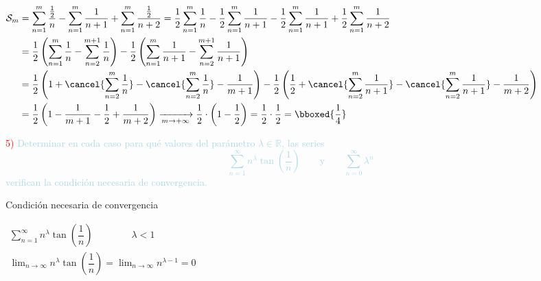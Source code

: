 \begin{enumerate}[label=\color{red}\alph*)]
		$\begin{aligned}
			\mathcal{S}_m&=\sum_{n=1}^{m}\dfrac{\frac{1}{2}}{n}-\sum_{n=1}^{m}\dfrac{1}{n+1}+\sum_{n=1}^{m}\dfrac{\frac{1}{2}}{n+2}=\dfrac{1}{2}\sum_{n=1}^{m}\dfrac{1}{n}-\dfrac{1}{2}\sum_{n=1}^{m}\dfrac{1}{n+1}-\dfrac{1}{2}\sum_{n=1}^{m}\dfrac{1}{n+1}+\dfrac{1}{2}\sum_{n=1}^{m}\dfrac{1}{n+2}\\
			&=\dfrac{1}{2}\left(\sum_{n=1}^{m}\dfrac{1}{n}-\sum_{n=2}^{m+1}\dfrac{1}{n}\right)-\dfrac{1}{2}\left(\sum_{n=1}^{m}\dfrac{1}{n+1}-\sum_{n=2}^{m+1}\dfrac{1}{n+1}\right)\\
			&=\dfrac{1}{2}\left(1+\cancel{\sum_{n=2}^{m}\dfrac{1}{n}}-\cancel{\sum_{n=2}^{m}\dfrac{1}{n}}-\dfrac{1}{m+1}\right)-\dfrac{1}{2}\left(\dfrac{1}{2}+\cancel{\sum_{n=2}^{m}\dfrac{1}{n+1}}-\cancel{\sum_{n=2}^{m}\dfrac{1}{n+1}}-\dfrac{1}{m+2}\right)\\
			&=\dfrac{1}{2}\left(1-\dfrac{1}{m+1}-\dfrac{1}{2}+\dfrac{1}{m+2}\right)\xrightarrow[m\to+\infty]{}\dfrac{1}{2}\cdot\left(1-\dfrac{1}{2}\right)=\dfrac{1}{2}\cdot\dfrac{1}{2}=\bboxed{\dfrac{1}{4}}
		\end{aligned}$
\end{enumerate}

\textcolor{red}{5)} \textcolor{lightblue}{Determinar en cada caso para qué valores del parámetro $\lambda\in\mathbb{R}$, las series \[ \sum_{n=1}^{\infty}n^\lambda\tan\left(\dfrac{1}{n}\right)\qquad\mathrm{y}\qquad\sum_{n=0}^{\infty}\lambda^n \] verifican la condición necesaria de convergencia.}

Condición necesaria de convergencia 

$\begin{array}{l}
	\sum_{n=1}^{\infty}n^\lambda\tan\left(\dfrac{1}{n}\right)\qquad\qquad\lambda<1\\
	\lim_{n\to\infty}n^\lambda\tan\left(\dfrac{1}{n}\right)=\lim_{n\to\infty}n^{\lambda-1}=0
\end{array}$


